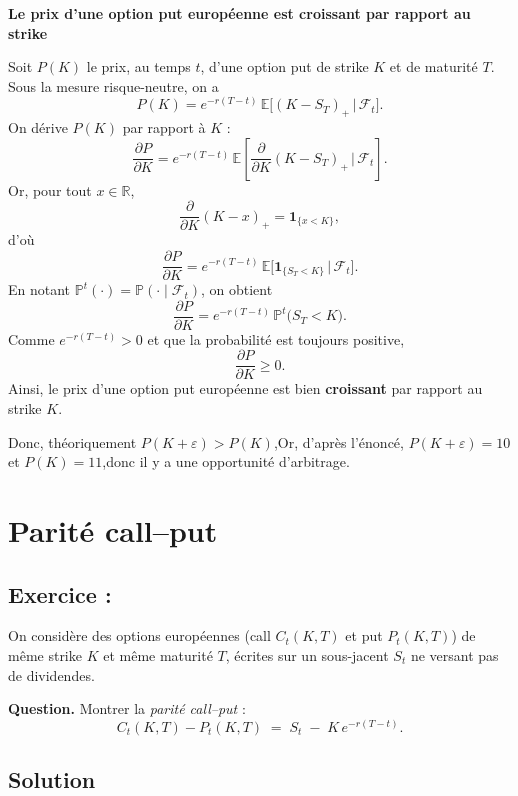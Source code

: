 \textbf{Le prix d'une option put européenne est croissant par rapport au strike }

Soit \( P(K) \) le prix, au temps \( t \), d'une option put de strike \( K \) et de maturité \( T \).
Sous la mesure risque-neutre, on a
\[
P(K) = e^{-r(T-t)} \, \mathbb{E}\big[ (K - S_T)_+ \,\big|\, \mathcal{F}_t \big].
\]
On dérive \( P(K) \) par rapport à \( K \) :
\[
\frac{\partial P}{\partial K}
= e^{-r(T-t)} \, \mathbb{E}\left[ 
\frac{\partial}{\partial K}(K - S_T)_+ \,\bigg|\, \mathcal{F}_t \right].
\]
Or, pour tout \( x \in \mathbb{R} \),
\[
\frac{\partial}{\partial K} (K - x)_+
= \mathbf{1}_{\{x < K\}},
\]
d'où
\[
\frac{\partial P}{\partial K}
= e^{-r(T-t)} \, \mathbb{E}\big[ \mathbf{1}_{\{S_T < K\}} \,\big|\, \mathcal{F}_t \big].
\]
En notant \( \mathbb{P}^t(\cdot) = \mathbb{P}(\cdot \mid \mathcal{F}_t) \), on obtient
\[
\frac{\partial P}{\partial K}
= e^{-r(T-t)} \, \mathbb{P}^t\big( S_T < K \big).
\]
Comme \( e^{-r(T-t)} > 0 \) et que la probabilité est toujours positive,
\[
\frac{\partial P}{\partial K} \ge 0.
\]
Ainsi, le prix d'une option put européenne est bien \textbf{croissant} par rapport au strike \( K \).


Donc, théoriquement  $P(K+\varepsilon) > P(K)$,Or, d'après l'énoncé, $P(K+\varepsilon) = 10$ et $P(K) = 11$,donc il y a une opportunité d'arbitrage.




\section{Parité call--put}

\subsection*{Exercice :}

\begin{exerciseBox}
On considère des options européennes (call $C_t(K,T)$ et put $P_t(K,T)$) de même strike $K$ et même maturité $T$,
écrites sur un sous-jacent $S_t$ ne versant pas de dividendes.
   

\medskip
\noindent
\textbf{Question.} Montrer la \emph{parité call--put} :
\[
C_t(K,T) - P_t(K,T) \;=\; S_t \;-\; K\,e^{-r(T-t)}.
\]

\end{exerciseBox}




\subsection*{Solution}

